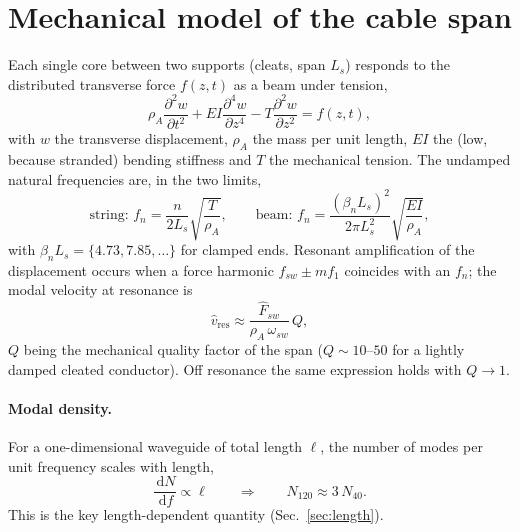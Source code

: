 \documentclass[11pt,a4paper]{article}
\newcommand{\ud}{\,\mathrm{d}}
\begin{document}
\section{Mechanical model of the cable span}\label{sec:mech}
Each single core between two supports (cleats, span $L_s$) responds to the
distributed transverse force $f(z,t)$ as a beam under tension,
\begin{equation}
\rho_A\frac{\partial^2 w}{\partial t^2}
+EI\frac{\partial^4 w}{\partial z^4}
-T\frac{\partial^2 w}{\partial z^2}
=f(z,t),
\label{eq:beam}
\end{equation}
with $w$ the transverse displacement, $\rho_A$ the mass per unit length, $EI$ the
(low, because stranded) bending stiffness and $T$ the mechanical tension. The
undamped natural frequencies are, in the two limits,
\begin{equation}
\text{string: } f_n=\frac{n}{2L_s}\sqrt{\frac{T}{\rho_A}},
\qquad
\text{beam: } f_n=\frac{(\beta_n L_s)^2}{2\pi L_s^2}\sqrt{\frac{EI}{\rho_A}},
\label{eq:fn}
\end{equation}
with $\beta_nL_s=\{4.73,7.85,\dots\}$ for clamped ends. Resonant amplification of
the displacement occurs when a force harmonic $f_{sw}\pm m f_1$ coincides with an
$f_n$; the modal velocity at resonance is
\begin{equation}
\hat v_{\text{res}}\approx\frac{\hat F_{sw}}{\rho_A\,\omega_{sw}}\,Q,
\label{eq:vres}
\end{equation}
$Q$ being the mechanical quality factor of the span ($Q\!\sim\!10$--$50$ for a
lightly damped cleated conductor). Off resonance the same expression holds with
$Q\!\to\!1$.

\paragraph{Modal density.}
For a one-dimensional waveguide of total length $\ell$, the number of modes per
unit frequency scales with length,
\begin{equation}
\frac{\ud N}{\ud f}\propto \ell
\qquad\Longrightarrow\qquad
N_{120}\approx 3\,N_{40}.
\label{eq:moddensity}
\end{equation}
This is the key length-dependent quantity (Sec.~\ref{sec:length}).

\end{document}
